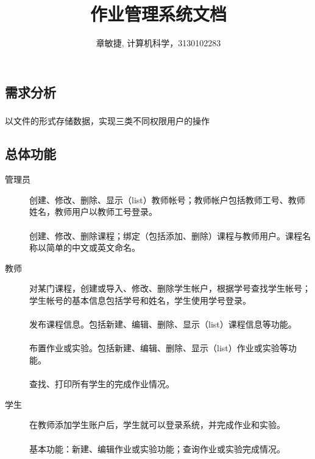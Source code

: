 \documentclass[notitlepage,cs4size,punct,oneside]{report}
\begin{document}
\begin{CJK}{UTF8}{hei} %


\renewcommand{\abstractname}{摘 \qquad 要}
\renewcommand{\contentsname}{\center 目\qquad\qquad 录}
\renewcommand{\listfigurename}{图 \quad 示 \quad 目 \quad 录}
\renewcommand{\listtablename}{表 \quad 格 \quad 目 \quad 录}
\renewcommand{\appendixname}{附录}
\renewcommand{\chaptername}{章节}
\renewcommand{\indexname}{\center 索 \qquad 引}
\renewcommand{\figurename}{图}
\renewcommand{\tablename}{表}

\newcommand{\upcite}[1]{\textsuperscript{\cite{#1}}}


\title{作业管理系统文档}
\author{章敏捷, 计算机科学，3130102283}

\maketitle
\tableofcontents
\pagebreak

\chapter{需求分析}
\paragraph{}以文件的形式存储数据，实现三类不同权限用户的操作
\section{总体功能}
\begin{description}
  \item[管理员] 创建、修改、删除、显示（list）教师帐号；教师帐户包括教师工号、教师姓名，教师用户以教师工号登录。\\ \\
 创建、修改、删除课程；绑定（包括添加、删除）课程与教师用户。课程名称以简单的中文或英文命名。
  \item[教师 ] 对某门课程，创建或导入、修改、删除学生帐户，根据学号查找学生帐号；学生帐号的基本信息包括学号和姓名，学生使用学号登录。\\ \\
  发布课程信息。包括新建、编辑、删除、显示（list）课程信息等功能。\\ \\
  布置作业或实验。包括新建、编辑、删除、显示（list）作业或实验等功能。\\ \\
  查找、打印所有学生的完成作业情况。
  \item[学生 ] 在教师添加学生账户后，学生就可以登录系统，并完成作业和实验。\\ \\
  基本功能：新建、编辑作业或实验功能；查询作业或实验完成情况。


\end{description}
\end{CJK}
\end{document}
